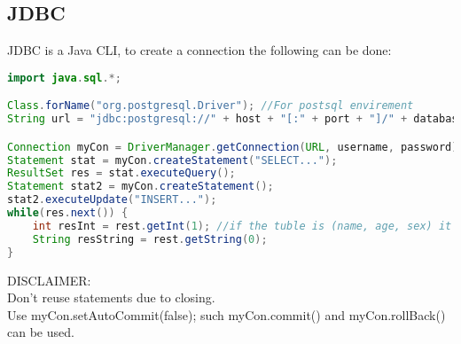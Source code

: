 \documentclass[12pt, a4paper]{article}
\begin{document}
		\subsection{JDBC}
			JDBC is a Java CLI, to create a connection the following can be done:
			\begin{lstlisting}[language=Java]
import java.sql.*;

Class.forName("org.postgresql.Driver"); //For postsql envirement
String url = "jdbc:postgresql://" + host + "[:" + port + "]/" + database;

Connection myCon = DriverManager.getConnection(URL, username, password);
Statement stat = myCon.createStatement("SELECT...");
ResultSet res = stat.executeQuery();
Statement stat2 = myCon.createStatement();
stat2.executeUpdate("INSERT...");
while(res.next()) {
	int resInt = rest.getInt(1); //if the tuble is (name, age, sex) it would return the int age
	String resString = rest.getString(0);
}
			\end{lstlisting}
			DISCLAIMER:\\
			Don't reuse statements due to closing.\\
			Use myCon.setAutoCommit(false); such myCon.commit() and myCon.rollBack() can be used.
\end{document}
